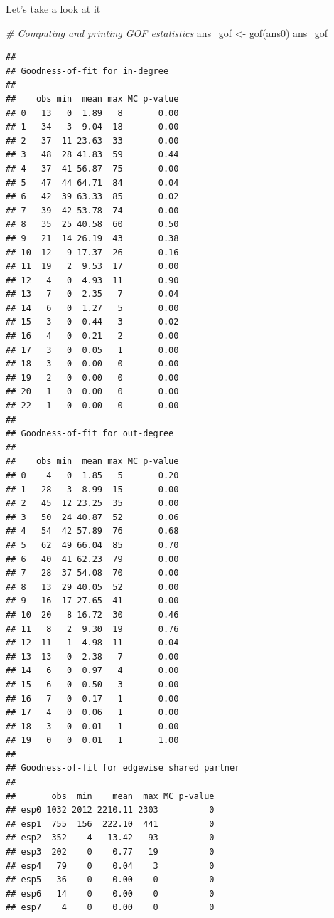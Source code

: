 \documentclass[
]{book}
\newenvironment{Shaded}{\begin{snugshade}}{\end{snugshade}}
\newcommand{\CommentTok}[1]{\textcolor[rgb]{0.56,0.35,0.01}{\textit{#1}}}
\newcommand{\FunctionTok}[1]{\textcolor[rgb]{0.00,0.00,0.00}{#1}}
\newcommand{\NormalTok}[1]{#1}
\newcommand{\OtherTok}[1]{\textcolor[rgb]{0.56,0.35,0.01}{#1}}
\begin{document}
Let's take a look at it

\begin{Shaded}
\begin{Highlighting}[]
\CommentTok{\# Computing and printing GOF estatistics}
\NormalTok{ans\_gof }\OtherTok{\textless{}{-}} \FunctionTok{gof}\NormalTok{(ans0)}
\NormalTok{ans\_gof}
\end{Highlighting}
\end{Shaded}

\begin{verbatim}
## 
## Goodness-of-fit for in-degree 
## 
##    obs min  mean max MC p-value
## 0   13   0  1.89   8       0.00
## 1   34   3  9.04  18       0.00
## 2   37  11 23.63  33       0.00
## 3   48  28 41.83  59       0.44
## 4   37  41 56.87  75       0.00
## 5   47  44 64.71  84       0.04
## 6   42  39 63.33  85       0.02
## 7   39  42 53.78  74       0.00
## 8   35  25 40.58  60       0.50
## 9   21  14 26.19  43       0.38
## 10  12   9 17.37  26       0.16
## 11  19   2  9.53  17       0.00
## 12   4   0  4.93  11       0.90
## 13   7   0  2.35   7       0.04
## 14   6   0  1.27   5       0.00
## 15   3   0  0.44   3       0.02
## 16   4   0  0.21   2       0.00
## 17   3   0  0.05   1       0.00
## 18   3   0  0.00   0       0.00
## 19   2   0  0.00   0       0.00
## 20   1   0  0.00   0       0.00
## 22   1   0  0.00   0       0.00
## 
## Goodness-of-fit for out-degree 
## 
##    obs min  mean max MC p-value
## 0    4   0  1.85   5       0.20
## 1   28   3  8.99  15       0.00
## 2   45  12 23.25  35       0.00
## 3   50  24 40.87  52       0.06
## 4   54  42 57.89  76       0.68
## 5   62  49 66.04  85       0.70
## 6   40  41 62.23  79       0.00
## 7   28  37 54.08  70       0.00
## 8   13  29 40.05  52       0.00
## 9   16  17 27.65  41       0.00
## 10  20   8 16.72  30       0.46
## 11   8   2  9.30  19       0.76
## 12  11   1  4.98  11       0.04
## 13  13   0  2.38   7       0.00
## 14   6   0  0.97   4       0.00
## 15   6   0  0.50   3       0.00
## 16   7   0  0.17   1       0.00
## 17   4   0  0.06   1       0.00
## 18   3   0  0.01   1       0.00
## 19   0   0  0.01   1       1.00
## 
## Goodness-of-fit for edgewise shared partner 
## 
##       obs  min    mean  max MC p-value
## esp0 1032 2012 2210.11 2303          0
## esp1  755  156  222.10  441          0
## esp2  352    4   13.42   93          0
## esp3  202    0    0.77   19          0
## esp4   79    0    0.04    3          0
## esp5   36    0    0.00    0          0
## esp6   14    0    0.00    0          0
## esp7    4    0    0.00    0          0

\end{verbatim}
\end{document}
